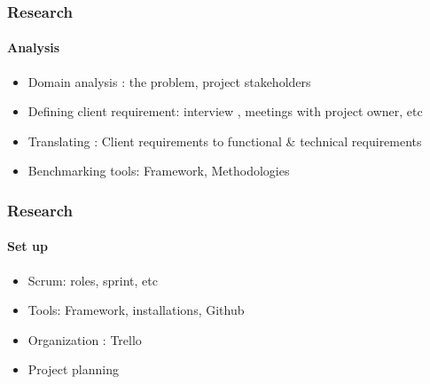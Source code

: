 \documentclass{beamer}
\begin{document}
\begin{frame}\frametitle{Research}\framesubtitle{Analysis}
\begin{itemize}
	\item Domain analysis : the problem, project stakeholders
	\item Defining client requirement: interview , meetings with project owner, etc
	\item Translating : Client requirements to functional \& technical requirements
	\item Benchmarking tools: Framework, Methodologies 
\end{itemize}
	
\end{frame}
\begin{frame}\frametitle{Research}\framesubtitle{Set up}
\begin{itemize}
	\item Scrum: roles, sprint, etc
	\item Tools: Framework, installations, Github
	\item Organization : Trello 
	\item Project planning
\end{itemize}
	
\end{frame}
\end{document}
